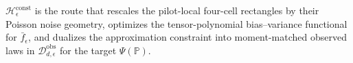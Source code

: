 \(\mathscr H_\epsilon^{\mathrm{const}}\) is the route that rescales the pilot-local four-cell rectangles by their Poisson noise geometry, optimizes the tensor-polynomial bias--variance functional for \(\bar f_\epsilon\), and dualizes the approximation constraint into moment-matched observed laws in \(\mathcal D_{d,\epsilon}^{\mathrm{obs}}\) for the target \(\Psi(\mathbb P)\).